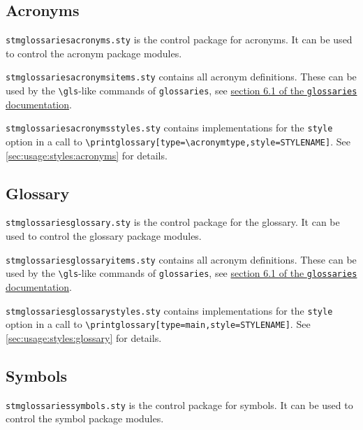 \documentclass[%
  type=article,%
  layout=koma,%
  hyperref=true,%
  conditionallox=true,%
  conditionalloxnewpage=false,%
  date=true,%
  index=true,%
  listings=true%
]{stmtext}
\newcommand{\tabledirname}{ZZZ_Table}
\newcommand{\tabledir}{\tabledirname/}
\begin{document}
\begingroup
\LTXtable{\linewidth}{\tabledir\jobname-packages.tex}
\endgroup

\subsection{Acronyms}
\label{sec:contents:acronyms}

\texttt{stmglossariesacronyms.sty} is the control package for acronyms. It can be used to control the acronym package modules.

\texttt{stmglossariesacronymsitems.sty} contains all acronym definitions. These can be used by the \texttt{\textbackslash gls}-like commands of \texttt{glossaries}, see \href{http://ftp.fau.de/ctan/macros/latex/contrib/glossaries/glossaries-user.pdf#section.6.1}{section 6.1 of the \texttt{glossaries} documentation}.

\texttt{stmglossariesacronymsstyles.sty} contains implementations for the \texttt{style} option in a call to \verb+\printglossary[type=\acronymtype,style=STYLENAME]+. See \autoref{sec:usage:styles:acronyms} for details.

\subsection{Glossary}
\label{sec:contents:glossary}

\texttt{stmglossariesglossary.sty} is the control package for the glossary. It can be used to control the glossary package modules.

\texttt{stmglossariesglossaryitems.sty} contains all acronym definitions. These can be used by the \texttt{\textbackslash gls}-like commands of \texttt{glossaries}, see \href{http://ftp.fau.de/ctan/macros/latex/contrib/glossaries/glossaries-user.pdf#section.6.1}{section 6.1 of the \texttt{glossaries} documentation}.

\texttt{stmglossariesglossarystyles.sty} contains implementations for the \texttt{style} option in a call to \verb+\printglossary[type=main,style=STYLENAME]+. See \autoref{sec:usage:styles:glossary} for details.

\subsection{Symbols}
\label{sec:contents:symbols}

\texttt{stmglossariessymbols.sty} is the control package for symbols. It can be used to control the symbol package modules.
\end{document}
